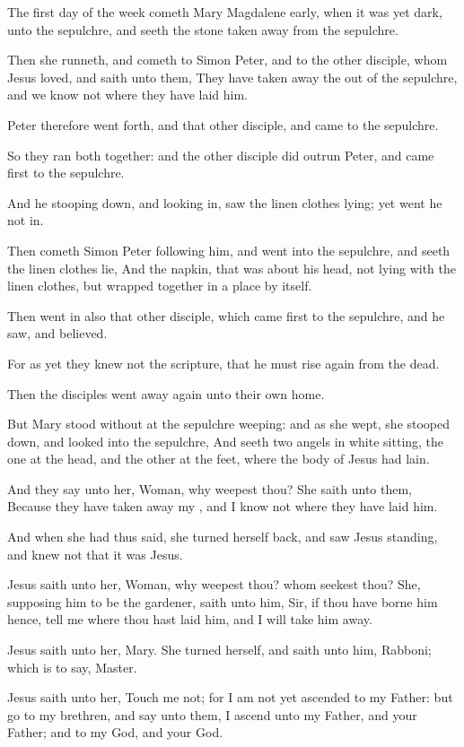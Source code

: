\Chapter
\Verse The first day of the week cometh Mary Magdalene early, when it was yet dark, unto the sepulchre, and seeth the stone taken away from the sepulchre.

\Verse Then she runneth, and cometh to Simon Peter, and to the other disciple, whom Jesus loved, and saith unto them, They have taken away the \LORD out of the sepulchre, and we know not where they have laid him.

\Verse Peter therefore went forth, and that other disciple, and came to the sepulchre.

\Verse So they ran both together: and the other disciple did outrun Peter, and came first to the sepulchre.

\Verse And he stooping down, and looking in, saw the linen clothes lying; yet went he not in.

\Verse Then cometh Simon Peter following him, and went into the sepulchre, and seeth the linen clothes lie, \Verse And the napkin, that was about his head, not lying with the linen clothes, but wrapped together in a place by itself.

\Verse Then went in also that other disciple, which came first to the sepulchre, and he saw, and believed.

\Verse For as yet they knew not the scripture, that he must rise again from the dead.

\Verse Then the disciples went away again unto their own home.

\Verse But Mary stood without at the sepulchre weeping: and as she wept, she stooped down, and looked into the sepulchre, \Verse And seeth two angels in white sitting, the one at the head, and the other at the feet, where the body of Jesus had lain.

\Verse And they say unto her, Woman, why weepest thou? She saith unto them, Because they have taken away my \LORD, and I know not where they have laid him.

\Verse And when she had thus said, she turned herself back, and saw Jesus standing, and knew not that it was Jesus.

\Verse Jesus saith unto her, Woman, why weepest thou? whom seekest thou?  She, supposing him to be the gardener, saith unto him, Sir, if thou have borne him hence, tell me where thou hast laid him, and I will take him away.

\Verse Jesus saith unto her, Mary. She turned herself, and saith unto him, Rabboni; which is to say, Master.

\Verse Jesus saith unto her, Touch me not; for I am not yet ascended to my Father: but go to my brethren, and say unto them, I ascend unto my Father, and your Father; and to my God, and your God.

